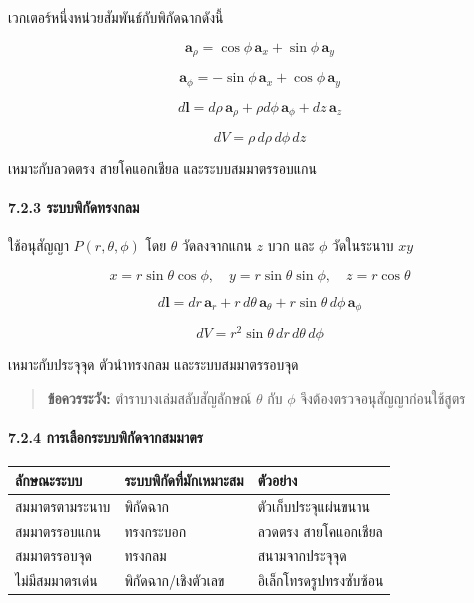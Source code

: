 เวกเตอร์หนึ่งหน่วยสัมพันธ์กับพิกัดฉากดังนี้

\[
\mathbf{a}_\rho=\cos\phi\,\mathbf{a}_x+\sin\phi\,\mathbf{a}_y
\]

\[
\mathbf{a}_\phi=-\sin\phi\,\mathbf{a}_x+\cos\phi\,\mathbf{a}_y
\]

\[
d\mathbf{l}=d\rho\,\mathbf{a}_\rho+\rho d\phi\,\mathbf{a}_\phi+dz\,\mathbf{a}_z
\]

\[
dV=\rho\,d\rho\,d\phi\,dz
\]

เหมาะกับลวดตรง สายโคแอกเชียล และระบบสมมาตรรอบแกน

\paragraph{7.2.3 ระบบพิกัดทรงกลม}

ใช้อนุสัญญา \(P(r,\theta,\phi)\) โดย \(\theta\) วัดลงจากแกน \(z\) บวก และ \(\phi\) วัดในระนาบ \(xy\)

\[
x=r\sin\theta\cos\phi,\quad
y=r\sin\theta\sin\phi,\quad
z=r\cos\theta
\]

\[
d\mathbf{l}=dr\,\mathbf{a}_r+r\,d\theta\,\mathbf{a}_\theta+r\sin\theta\,d\phi\,\mathbf{a}_\phi
\]

\[
dV=r^2\sin\theta\,dr\,d\theta\,d\phi
\]

เหมาะกับประจุจุด ตัวนำทรงกลม และระบบสมมาตรรอบจุด

\begin{quote}
\textbf{ข้อควรระวัง:} ตำราบางเล่มสลับสัญลักษณ์ \(\theta\) กับ \(\phi\) จึงต้องตรวจอนุสัญญาก่อนใช้สูตร
\end{quote}

\paragraph{7.2.4 การเลือกระบบพิกัดจากสมมาตร}

\begin{table}[htbp]
    \centering
    \begin{tabularx}{\textwidth}{L{0.25\textwidth} L{0.27\textwidth} Y}
        \hline
        \textbf{ลักษณะระบบ} & \textbf{ระบบพิกัดที่มักเหมาะสม} & \textbf{ตัวอย่าง} \\
        \hline
        สมมาตรตามระนาบ & พิกัดฉาก & ตัวเก็บประจุแผ่นขนาน \\
        สมมาตรรอบแกน & ทรงกระบอก & ลวดตรง สายโคแอกเชียล \\
        สมมาตรรอบจุด & ทรงกลม & สนามจากประจุจุด \\
        ไม่มีสมมาตรเด่น & พิกัดฉาก/เชิงตัวเลข & อิเล็กโทรดรูปทรงซับซ้อน \\
        \hline
    \end{tabularx}
\end{table}

